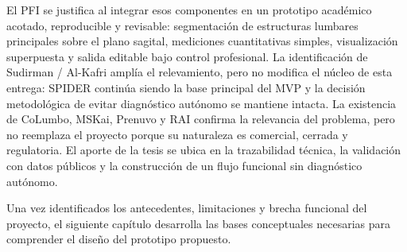 El PFI se justifica al integrar esos componentes en un prototipo académico acotado, reproducible y revisable: segmentación de estructuras lumbares principales sobre el plano sagital, mediciones cuantitativas simples, visualización superpuesta y salida editable bajo control profesional. La identificación de Sudirman / Al-Kafri amplía el relevamiento, pero no modifica el núcleo de esta entrega: SPIDER continúa siendo la base principal del MVP y la decisión metodológica de evitar diagnóstico autónomo se mantiene intacta. La existencia de CoLumbo, MSKai, Prenuvo y RAI confirma la relevancia del problema, pero no reemplaza el proyecto porque su naturaleza es comercial, cerrada y regulatoria. El aporte de la tesis se ubica en la trazabilidad técnica, la validación con datos públicos y la construcción de un flujo funcional sin diagnóstico autónomo.

Una vez identificados los antecedentes, limitaciones y brecha funcional del proyecto, el siguiente capítulo desarrolla las bases conceptuales necesarias para comprender el diseño del prototipo propuesto.
